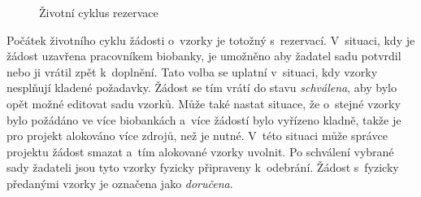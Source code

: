 \documentclass[11pt, draft, oneside]{fithesis2}
\begin{document}
\begin{figure}[hbtp]
\begin{center}
\caption{Životní cyklus rezervace}
\label{fig:implementace:rezervace:cyklus}
\end{center}
\end{figure}

Počátek životního cyklu žádosti o~vzorky je totožný s~rezervací. V~situaci, kdy je žádost uzavřena pracovníkem biobanky, je umožněno aby žadatel sadu potvrdil nebo ji vrátil zpět k~doplnění. Tato volba se uplatní v~situaci, kdy vzorky nesplňují kladené požadavky. Žádost se tím vrátí do stavu \textit{schválena}, aby bylo opět možné editovat sadu vzorků.
Může také nastat situace, že o~stejné vzorky bylo požádáno ve více biobankách a~více žádostí bylo vyřízeno kladně, takže je pro projekt alokováno více zdrojů, než je nutné. V~této situaci může správce projektu žádost smazat a~tím alokované vzorky uvolnit.
Po schválení vybrané sady žadateli jsou tyto vzorky fyzicky připraveny k~odebrání. Žádost s~fyzicky předanými vzorky je označena jako \textit{doručena}.
\end{document}
